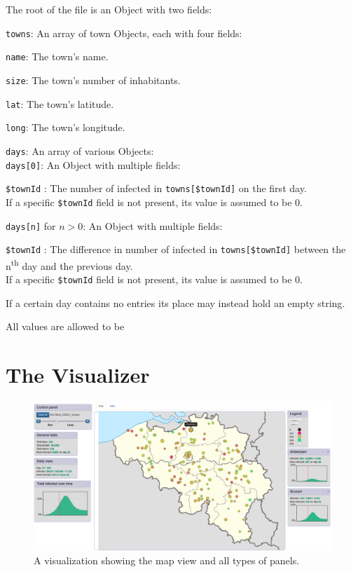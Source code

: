 The root of the file is an Object with two fields:
\begin{compactitem}	
	\item \texttt{towns}: An array of town Objects, each with four fields:
	\begin{compactitem}	
		\item \texttt{name}: The town's name.
		\item \texttt{size}: The town's number of inhabitants.
		\item \texttt{lat}: The town's latitude.
		\item \texttt{long}: The town's longitude.
	\end{compactitem}
	\pagebreak
	
	\item \texttt{days}: An array of various Objects:\\
	\texttt{days[0]}: An Object with multiple fields:
	\begin{compactitem}				
		\item \texttt{\$townId} : The number of infected in \texttt{towns[\$townId]} on the first day.\\
		If a specific \texttt{\$townId} field is not present, its value is assumed to be 0.
	\end{compactitem}
	\texttt{days[n]} for $n > 0$: An Object with multiple fields:
	\begin{compactitem}				
		\item \texttt{\$townId} : The difference in number of infected in \texttt{towns[\$townId]} between the n\textsuperscript{th} day and the previous day.\\
		If a specific \texttt{\$townId} field is not present, its value is assumed to be 0.
	\end{compactitem}
	
	\vspace{4pt}
	If a certain day contains no entries its place may instead hold an empty string.
\end{compactitem}

All values are allowed to be 

\section{The Visualizer}

\begin{figure}[!b]
	\centering
	\includegraphics[width=\textwidth]{images/visualizer.png}
	\caption{A visualization showing the map view and all types of panels.}
\end{figure}

